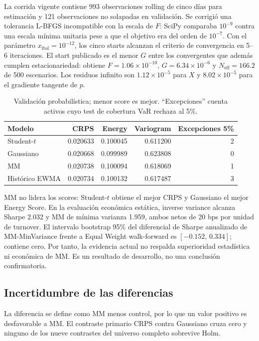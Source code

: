 \documentclass[11pt,letterpaper]{article}
\begin{document}
La corrida vigente contiene 993 observaciones rolling de cinco días para estimación
y 121 observaciones no solapadas en validación. Se corrigió una tolerancia L-BFGS
incompatible con la escala de $F$: SciPy comparaba $10^{-9}$ contra una escala mínima
unitaria pese a que el objetivo era del orden de $10^{-7}$. Con el parámetro
$x_{\mathrm{ftol}}=10^{-12}$, los cinco starts alcanzan el criterio de convergencia
en 5--6 iteraciones. El start publicado es el menor $G$ entre los convergentes que
además cumplen estacionariedad: obtiene $F=1.06\times10^{-10}$,
$G=6.34\times10^{-6}$ y $N_{\mathrm{eff}}=166.2$ de 500 escenarios. Los residuos
infinito son $1.12\times10^{-5}$ para $X$ y $8.02\times10^{-5}$ para el gradiente
tangente de $p$.

\begin{table}[ht]
\centering
\small
\begin{tabular}{lrrrr}
\toprule
Modelo & CRPS & Energy & Variogram & Excepciones 5\% \\
\midrule
Student-$t$ & 0.020633 & 0.100045 & 0.611200 & 2 \\
Gaussiano & 0.020668 & 0.099989 & 0.623808 & 0 \\
MM & 0.020738 & 0.100094 & 0.618069 & 1 \\
Histórico EWMA & 0.020734 & 0.100132 & 0.617487 & 3 \\
\bottomrule
\end{tabular}
\caption{Validación probabilística; menor score es mejor. ``Excepciones'' cuenta
activos cuyo test de cobertura VaR rechaza al 5\%.}
\end{table}

MM no lidera los scores: Student-$t$ obtiene el mejor CRPS y Gaussiano el mejor
Energy Score. En la
evaluación económica estática, inverse variance alcanza Sharpe 2.032 y MM de mínima
varianza 1.959, ambos netos de 20 bps por unidad de turnover. El intervalo bootstrap
95\% del diferencial de Sharpe anualizado de MM-MinVariance frente a Equal Weight
walk-forward es $[-0.152,\,0.334]$; contiene cero. Por tanto, la evidencia actual no
respalda superioridad estadística ni económica de MM. Es un resultado de desarrollo,
no una conclusión confirmatoria.

\subsection*{Incertidumbre de las diferencias}

La diferencia se define como MM menos control, por lo que un valor positivo es
desfavorable a MM. El contraste primario CRPS contra Gaussiano cruza cero y ninguno
de los nueve contrastes del universo completo sobrevive Holm.
\end{document}
